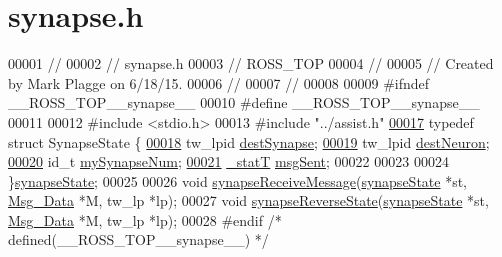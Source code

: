 \hypertarget{synapse_8h_source}{}\section{synapse.\+h}
\label{synapse_8h_source}

\begin{DoxyCode}
00001 \textcolor{comment}{//}
00002 \textcolor{comment}{//  synapse.h}
00003 \textcolor{comment}{//  ROSS\_TOP}
00004 \textcolor{comment}{//}
00005 \textcolor{comment}{//  Created by Mark Plagge on 6/18/15.}
00006 \textcolor{comment}{//}
00007 \textcolor{comment}{//}
00008 
00009 \textcolor{preprocessor}{#ifndef \_\_ROSS\_TOP\_\_synapse\_\_}
00010 \textcolor{preprocessor}{#define \_\_ROSS\_TOP\_\_synapse\_\_}
00011 
00012 \textcolor{preprocessor}{#include <stdio.h>}
00013 \textcolor{preprocessor}{#include "../assist.h"}
\hypertarget{synapse_8h_source_l00017}{}\hyperlink{structsynapse_state}{00017} \textcolor{keyword}{typedef} \textcolor{keyword}{struct }SynapseState \{
\hypertarget{synapse_8h_source_l00018}{}\hyperlink{structsynapse_state_a665999819b255f36d756f17b85bc9a03}{00018}     tw\_lpid \hyperlink{structsynapse_state_a665999819b255f36d756f17b85bc9a03}{destSynapse};
\hypertarget{synapse_8h_source_l00019}{}\hyperlink{structsynapse_state_a0710dca002b4b3a3f7ae72633bef3691}{00019}     tw\_lpid \hyperlink{structsynapse_state_a0710dca002b4b3a3f7ae72633bef3691}{destNeuron};
\hypertarget{synapse_8h_source_l00020}{}\hyperlink{structsynapse_state_ab73db495221608d3eae73d51670d29f0}{00020}     id\_t \hyperlink{structsynapse_state_ab73db495221608d3eae73d51670d29f0}{mySynapseNum};
\hypertarget{synapse_8h_source_l00021}{}\hyperlink{structsynapse_state_a7d208d07285a221f4ef19f6fa307b536}{00021}     \hyperlink{assist_8h_ad77e6fc5a9b03d46e7c97b7c4b92e89f}{\_statT} \hyperlink{structsynapse_state_a7d208d07285a221f4ef19f6fa307b536}{msgSent};
00022     
00023 
00024 \}\hyperlink{structsynapse_state}{synapseState};
00025 
00026 \textcolor{keywordtype}{void} \hyperlink{synapse_8h_a751f7a42bfc55f55fc0fd299165c5906}{synapseReceiveMessage}(\hyperlink{structsynapse_state}{synapseState} *st, 
      \hyperlink{struct_msg___data}{Msg\_Data} *M, tw\_lp *lp);
00027 \textcolor{keywordtype}{void} \hyperlink{synapse_8h_a8f9aab389278863b114c27bc10257864}{synapseReverseState}(\hyperlink{structsynapse_state}{synapseState} *st, 
      \hyperlink{struct_msg___data}{Msg\_Data} *M, tw\_lp *lp);
00028 \textcolor{preprocessor}{#endif }\textcolor{comment}{/* defined(\_\_ROSS\_TOP\_\_synapse\_\_) */}\textcolor{preprocessor}{}
\end{DoxyCode}
